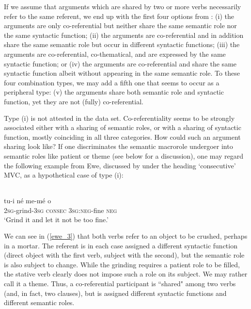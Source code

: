 If we assume that arguments which are shared by two or more verbs necessarily refer to the same referent, we end up with the first four options from : (i) the arguments are only co-referential but neither share the same semantic role nor the same syntactic function; (ii) the arguments are co-referential and in addition share the same semantic role but occur in different syntactic functions; (iii) the arguments are co-referential, co-thematical, and are expressed by the same syntactic function; or (iv) the arguments are co-referential and share the same syntactic function albeit without appearing in the same semantic role. To these four combination types, we may add a fifth one that seems to occur as a peripheral type: (v) the arguments share both semantic role and syntactic function, yet they are not (fully) co-referential.

Type (i) is not attested in the data set. Co-referentiality seems to be strongly associated either with a sharing of semantic roles, or with a sharing of syntactic function, mostly coinciding in all three categories. How could such an argument sharing look like? If one discriminates the semantic macrorole undergoer into semantic roles like patient or theme (see below for a discussion), one may regard the following example from Ewe, discussed by \citet{ameka2005multiverb} under the heading `consecutive' MVC, as a hypothetical case of type (i):

\ea \label{ewe_3}
\\
\gll tu-i né me-mé o \\
2\textsc{sg}-grind-3\textsc{sg} \textsc{consec} 3\textsc{sg}:\textsc{neg}-fine \textsc{neg} \\
\glft `Grind it and let it not be too fine.'\\ 
\z

We can see in (\ref{ewe_3}) that both verbs refer to an object to be crushed, perhaps in a mortar. The referent is in each case assigned a different syntactic function (direct object with the first verb, subject with the second), but the semantic role is also subject to change. While the grinding requires a patient role to be filled, the stative verb clearly does not impose such a role on its subject. We may rather call it a theme. Thus, a co-referential participant is ``shared" among two verbs (and, in fact, two clauses), but is assigned different syntactic functions and different semantic roles.


